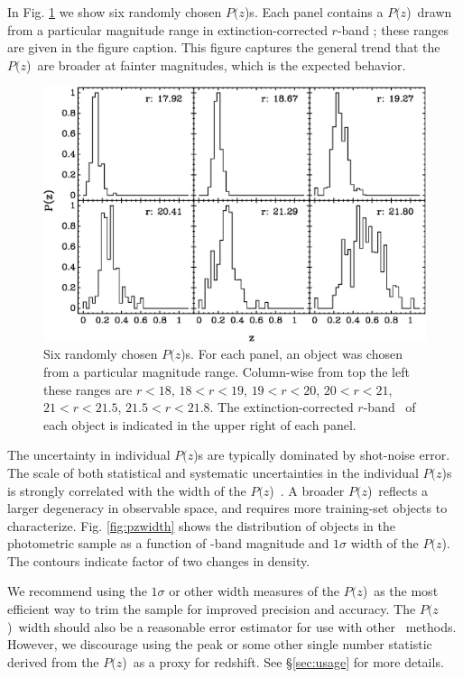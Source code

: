 \documentclass[preprint]{aastex}
\newcommand{\pofz}{$P(z$)}
\begin{document}
In Fig. \ref{fig:rand6pofz} we show six randomly chosen \pofz s.  Each panel
contains a \pofz\ drawn from a particular magnitude range in extinction-corrected
$r$-band \cmodelmag; these ranges are given in the figure caption.
This figure captures the general trend that the \pofz\ are broader at
fainter magnitudes, which is the expected behavior.

\begin{figure} [t]\centering
    \includegraphics[scale=0.7]{figures/seed25-5-6pofz.eps}
    \caption{Six randomly chosen \pofz s.  For each panel, an object was
    chosen from a particular magnitude range.  Column-wise from top the
    left these ranges are $r < 18$, $18 < r < 19$, $19 < r < 20$, 
    $20 < r < 21$, $21 < r < 21.5$, $21.5 < r < 21.8$.  
    The extinction-corrected $r$-band \cmodelmag\ of each object
    is indicated in the upper right of each panel.
    \label{fig:rand6pofz}}
\end{figure}

The uncertainty in individual \pofz s are typically dominated by shot-noise
error.  The scale of both statistical and systematic uncertainties in the
individual \pofz s is strongly correlated with the width of the \pofz\
\citep{CunhaPhotoz09}.  A broader \pofz\ reflects a larger degeneracy in
observable space, and requires more training-set objects to characterize.  Fig.
\ref{fig:pzwidth} shows the distribution of objects in the photometric sample
as a function of \rmag-band magnitude and $1 \sigma$ width of the \pofz.  The
contours indicate factor of two changes in density.  

We recommend using the $1 \sigma$ or other width measures of the \pofz\ as the
most efficient way to trim the sample for improved precision and accuracy.  The
\pofz\ width should also be a reasonable error estimator for use with other
\photoz\ methods.  However, we discourage using the peak or some other single
number statistic derived from the \pofz\ as a proxy for redshift. See 
\S \ref{sec:usage} for more details.

\end{document}
